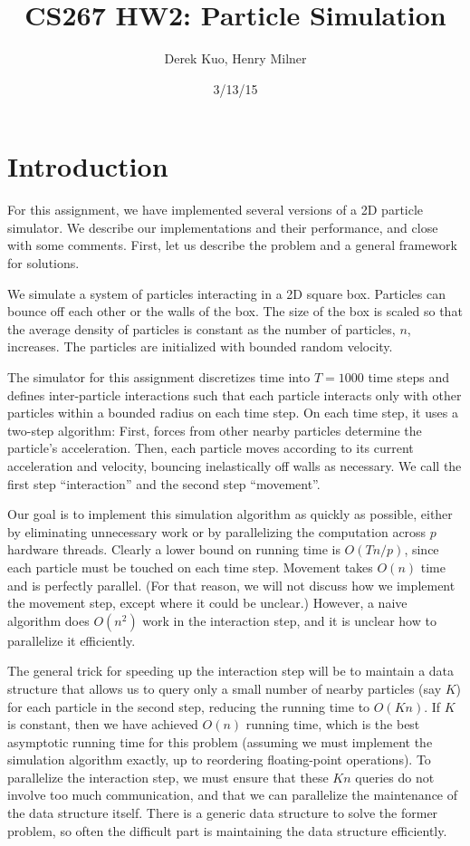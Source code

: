 \documentclass{article}
\author{Derek Kuo, Henry Milner}
\title{CS267 HW2: Particle Simulation}
\date{3/13/15}
\begin{document}
\maketitle

\section{Introduction}
For this assignment, we have implemented several versions of a 2D particle simulator.  We describe our implementations and their performance, and close with some comments.  First, let us describe the problem and a general framework for solutions.

We simulate a system of particles interacting in a 2D square box.  Particles can bounce off each other or the walls of the box.  The size of the box is scaled so that the average density of particles is constant as the number of particles, $n$, increases.  The particles are initialized with bounded random velocity.

The simulator for this assignment discretizes time into $T = 1000$ time steps and defines inter-particle interactions such that each particle interacts only with other particles within a bounded radius on each time step.  On each time step, it uses a two-step algorithm: First, forces from other nearby particles determine the particle's acceleration.  Then, each particle moves according to its current acceleration and velocity, bouncing inelastically off walls as necessary.  We call the first step ``interaction'' and the second step ``movement''.

Our goal is to implement this simulation algorithm as quickly as possible, either by eliminating unnecessary work or by parallelizing the computation across $p$ hardware threads.  Clearly a lower bound on running time is $O(T n / p)$, since each particle must be touched on each time step.  Movement takes $O(n)$ time and is perfectly parallel.  (For that reason, we will not discuss how we implement the movement step, except where it could be unclear.)  However, a naive algorithm does $O(n^2)$ work in the interaction step, and it is unclear how to parallelize it efficiently.

The general trick for speeding up the interaction step will be to maintain a data structure that allows us to query only a small number of nearby particles (say $K$) for each particle in the second step, reducing the running time to $O(Kn)$.  If $K$ is constant, then we have achieved $O(n)$ running time, which is the best asymptotic running time for this problem (assuming we must implement the simulation algorithm exactly, up to reordering floating-point operations).  To parallelize the interaction step, we must ensure that these $Kn$ queries do not involve too much communication, and that we can parallelize the maintenance of the data structure itself.  There is a generic data structure to solve the former problem, so often the difficult part is maintaining the data structure efficiently.
\end{document}
